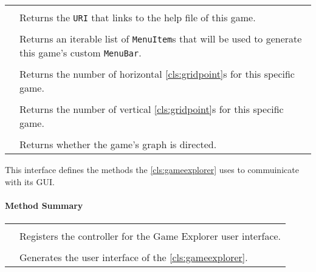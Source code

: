 \begin{longtable}{Lp{10cm}}
	 \\
	& Returns the \texttt{URI} that links to the help file of this game. \\
	 \\
	& Returns an iterable list of \texttt{MenuItem}s that will be used to generate this game's custom \texttt{MenuBar}. \\
	 \\
	& Returns the number of horizontal \ref{cls:gridpoint}s for this specific game. \\
	 \\
	& Returns the number of vertical \ref{cls:gridpoint}s for this specific game. \\
	 \\
	& Returns whether the game's graph is directed. \\
	\hline
\end{longtable}

\pagebreak

This interface defines the methods the \ref{cls:gameexplorer} uses to commuinicate with its \gls{GUI}. \\

\centerdash

\paragraph*{Method Summary}
\paragraph*{}
\begin{longtable}{Lp{10cm}}
	\startmethodtable
	 \\
	& Registers the controller for the Game Explorer user interface. \\
	 \\
	& Generates the user interface of the \ref{cls:gameexplorer}. \\
	\hline
\end{longtable}

